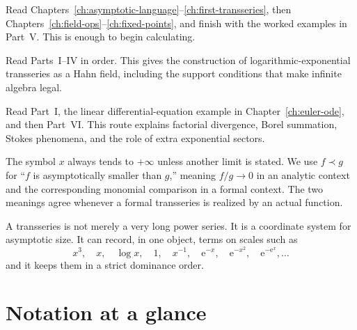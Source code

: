 \documentclass[11pt,oneside]{book}
\theoremstyle{definition}
\theoremstyle{remark}
\newcommand{\e}{\mathrm{e}}
\newcommand{\precdom}{\prec}
\begin{document}
\begin{description}[style=nextline,leftmargin=2em]
\item[The practical route]
Read Chapters~\ref{ch:asymptotic-language}--\ref{ch:first-transseries}, then
Chapters~\ref{ch:field-ops}--\ref{ch:fixed-points}, and finish with the worked
examples in Part~V. This is enough to begin calculating.

\item[The formal-algebra route]
Read Parts~I--IV in order. This gives the construction of logarithmic-exponential
transseries as a Hahn field, including the support conditions that make infinite
algebra legal.

\item[The analytic/resurgent route]
Read Part~I, the linear differential-equation example in
Chapter~\ref{ch:euler-ode}, and then Part~VI. This route explains factorial
divergence, Borel summation, Stokes phenomena, and the role of extra exponential
sectors.
\end{description}

The symbol $x$ always tends to $+\infty$ unless another limit is stated. We use
$f\precdom g$ for ``$f$ is asymptotically smaller than $g$,'' meaning
$f/g\to0$ in an analytic context and the corresponding monomial comparison in a
formal context. The two meanings agree whenever a formal transseries is realized
by an actual function.

\begin{bigidea}
A transseries is not merely a very long power series. It is a coordinate system
for asymptotic size. It can record, in one object, terms on scales such as
\[
  x^3,\quad x,\quad \log x,\quad 1,\quad x^{-1},\quad
  \e^{-x},\quad \e^{-x^2},\quad \e^{-\e^x},\ldots
\]
and it keeps them in a strict dominance order.
\end{bigidea}

\tableofcontents
\listoffigures

\chapter*{Notation at a glance}
\end{document}
